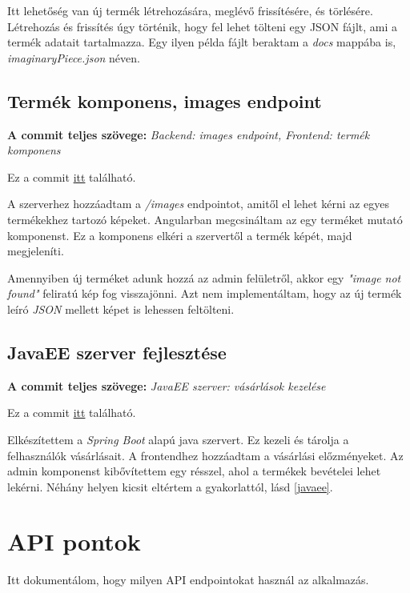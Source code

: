 \documentclass[]{article}
\begin{document}
Itt lehetőség van új termék létrehozására, meglévő frissítésére, és törlésére. Létrehozás és frissítés úgy történik, hogy fel lehet tölteni egy JSON fájlt, ami a termék adatait tartalmazza. Egy ilyen példa fájlt beraktam a \textit{docs} mappába is, \textit{imaginaryPiece.json} néven.

\subsection{Termék komponens, images endpoint}

\noindent
\textbf{A commit teljes szövege:} \textit{Backend: images endpoint, Frontend: termék komponens}

\bigskip
\noindent
Ez a commit \href{https://github.com/Gtomika/prf-project/commit/d57c3f971a6aa08f9c6dffd355d62fdd5254c3b3}{itt} található.
\bigskip

A szerverhez hozzáadtam a \textit{/images} endpointot, amitől el lehet kérni az egyes termékekhez tartozó képeket. Angularban megcsináltam az egy terméket mutató komponenst. Ez a komponens elkéri a szervertől a termék képét, majd megjeleníti.

Amennyiben új terméket adunk hozzá az admin felületről, akkor egy \textit{"image not found"} feliratú kép fog visszajönni. Azt nem implementáltam, hogy az új termék leíró \textit{JSON} mellett képet is lehessen feltölteni.

\subsection{JavaEE szerver fejlesztése}

\noindent
\textbf{A commit teljes szövege:} \textit{JavaEE szerver: vásárlások kezelése }

\bigskip
\noindent
Ez a commit \href{https://github.com/Gtomika/prf-project/commit/5dcc9df3c42db872387fee519fe37f45b69bf757}{itt} található.
\bigskip

Elkészítettem a \textit{Spring Boot} alapú java szervert. Ez kezeli és tárolja a felhasználók vásárlásait. A frontendhez hozzáadtam a vásárlási előzményeket. Az admin komponenst kibővítettem egy résszel, ahol a termékek bevételei lehet lekérni. Néhány helyen kicsit eltértem a gyakorlattól, lásd \ref{javaee}.

\section{API pontok}

Itt dokumentálom, hogy milyen API endpointokat használ az alkalmazás.
\end{document}

